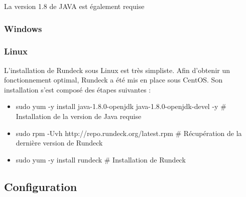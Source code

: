 \documentclass[12pt]{article}
\begin{document}
\vspace{0.5cm}

La version 1.8 de JAVA est également requise
\subsubsection{Windows}

\subsubsection{Linux}

L'installation de Rundeck sous Linux est très simpliste. Afin d'obtenir un fonctionnement optimal, Rundeck a été mis en place sous CentOS. Son installation s'est composé des étapes suivantes : 

\vspace{0.5cm}

\begin{itemize}
    \item sudo yum -y install java-1.8.0-openjdk java-1.8.0-openjdk-devel -y \# Installation de la version de Java requise
    \item sudo rpm -Uvh http://repo.rundeck.org/latest.rpm \# Récupération de la dernière version de Rundeck
    \item sudo yum -y install rundeck \# Installation de Rundeck
\end{itemize}

\subsection{Configuration}
\end{document}
